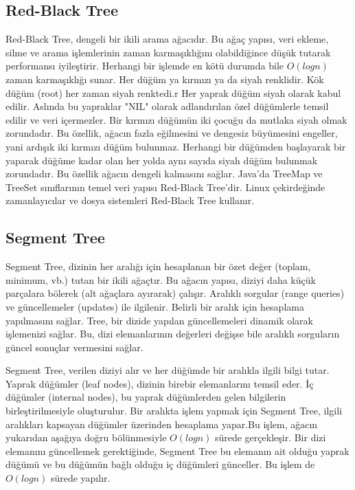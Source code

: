 \newpage

\subsection{Red-Black Tree}

Red-Black Tree, dengeli bir ikili arama ağacıdır. Bu ağaç yapısı, veri ekleme, silme ve arama işlemlerinin zaman karmaşıklığını olabildiğince düşük tutarak performansı iyileştirir. Herhangi bir işlemde en kötü durumda bile $O(logn)$ zaman karmaşıklığı sunar. Her düğüm ya kırmızı ya da siyah renklidir. Kök düğüm (root) her zaman siyah renktedi.r Her yaprak düğüm siyah olarak kabul edilir. Aslında bu yapraklar "NIL" olarak adlandırılan özel düğümlerle temsil edilir ve veri içermezler. Bir kırmızı düğümün iki çocuğu da mutlaka siyah olmak zorundadır. Bu özellik, ağacın fazla eğilmesini ve dengesiz büyümesini engeller, yani ardışık iki kırmızı düğüm bulunmaz. Herhangi bir düğümden başlayarak bir yaparak düğüme kadar olan her yolda aynı sayıda siyah düğüm bulunmak zorundadır. Bu özellik ağacın dengeli kalmasını sağlar. Java'da TreeMap ve TreeSet sınıflarının temel veri yapısı Red-Black Tree'dir. Linux çekirdeğinde zamanlayıcılar ve dosya sistemleri Red-Black Tree kullanır.

\newpage

\subsection{Segment Tree}

Segment Tree, dizinin her aralığı için hesaplanan bir özet değer (toplam, minimum, vb.) tutan bir ikili ağaçtır. Bu ağacın yapısı, diziyi daha küçük parçalara bölerek (alt ağaçlara ayırarak) çalışır. Aralıklı sorgular (range queries) ve güncellemeler (updates) ile ilgilenir. Belirli bir aralık için hesaplama yapılmasını sağlar. Tree, bir dizide yapılan güncellemeleri dinamik olarak işlemenizi sağlar. Bu, dizi elemanlarının değerleri değişse bile aralıklı sorguların güncel sonuçlar vermesini sağlar.

Segment Tree, verilen diziyi alır ve her düğümde bir aralıkla ilgili bilgi tutar. Yaprak düğümler (leaf nodes), dizinin birebir elemanlarını temsil eder. İç düğümler (internal nodes), bu yaprak düğümlerden gelen bilgilerin birleştirilmesiyle oluşturulur. Bir aralıkta işlem yapmak için Segment Tree, ilgili aralıkları kapsayan düğümler üzerinden hesaplama yapar.Bu işlem, ağacın yukarıdan aşağıya doğru bölünmesiyle $O(logn)$ sürede gerçekleşir. Bir dizi elemanını güncellemek gerektiğinde, Segment Tree bu elemanın ait olduğu yaprak düğümü ve bu düğümün bağlı olduğu iç düğümleri günceller. Bu işlem de $O(logn)$ sürede yapılır.

